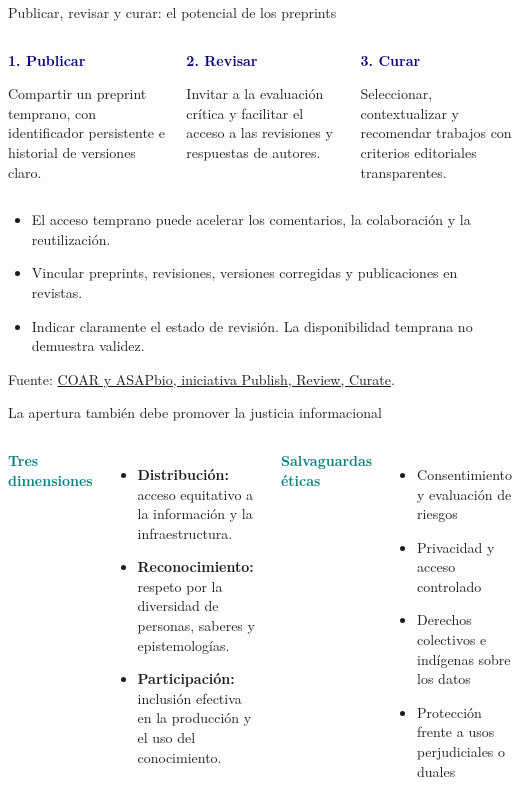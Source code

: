 \documentclass[aspectratio=169,11pt]{beamer}
\newcommand{\tagline}[1]{\textcolor{Teal}{\bfseries\small#1}}
\newcommand{\keypoint}[2]{%
  \begin{minipage}[t]{0.98\linewidth}
  \colorbox{Mist}{\parbox{0.92\linewidth}{\raggedright\vspace{0.08cm}\textcolor{Navy}{\bfseries #1}\par\small #2\vspace{0.08cm}}}
  \end{minipage}}
\begin{document}
\begin{frame}{Publicar, revisar y curar: el potencial de los preprints}
  \begin{columns}[T,onlytextwidth]
      \keypoint{1. Publicar}{Compartir un preprint temprano, con identificador persistente e historial de versiones claro.}
      \keypoint{2. Revisar}{Invitar a la evaluación crítica y facilitar el acceso a las revisiones y respuestas de autores.}
      \keypoint{3. Curar}{Seleccionar, contextualizar y recomendar trabajos con criterios editoriales transparentes.}
  \end{columns}
  \vspace{.35cm}
  \begin{itemize}\setlength\itemsep{.16cm}
    \item El acceso temprano puede acelerar los comentarios, la colaboración y la reutilización.
    \item Vincular preprints, revisiones, versiones corregidas y publicaciones en revistas.
    \item Indicar claramente el estado de revisión. La disponibilidad temprana no demuestra validez.
  \end{itemize}
  \vfill
  {\tiny Fuente: \href{https://publish-review-curate.org/}{COAR y ASAPbio, iniciativa Publish, Review, Curate}.}
\end{frame}

\begin{frame}{La apertura también debe promover la justicia informacional}
  \begin{columns}[T,onlytextwidth]
      \tagline{Tres dimensiones}
      \vspace{0.25cm}
      \begin{itemize}\setlength\itemsep{0.22cm}
        \item \textbf{Distribución:} acceso equitativo a la información y la infraestructura.
        \item \textbf{Reconocimiento:} respeto por la diversidad de personas, saberes y epistemologías.
        \item \textbf{Participación:} inclusión efectiva en la producción y el uso del conocimiento.
      \end{itemize}
      \tagline{Salvaguardas éticas}
      \vspace{0.25cm}
      \begin{itemize}\setlength\itemsep{0.22cm}
        \item Consentimiento y evaluación de riesgos
        \item Privacidad y acceso controlado
        \item Derechos colectivos e indígenas sobre los datos
        \item Protección frente a usos perjudiciales o duales
      \end{itemize}
  \end{columns}
\end{frame}
\end{document}
